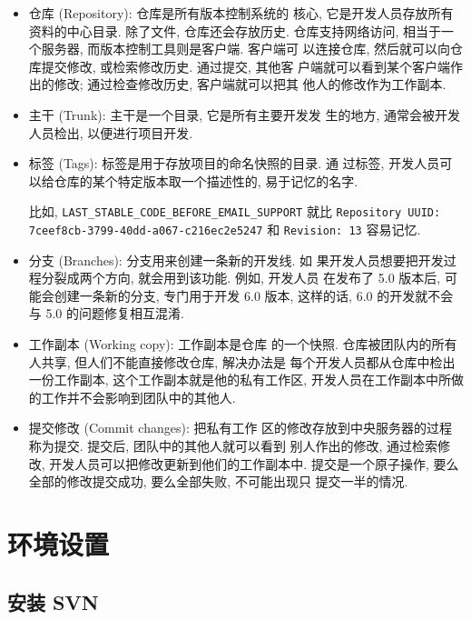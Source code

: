\documentclass[nofonts, oneside]{ctexart}
\begin{document}
\begin{itemize}
  \item 仓库 (Repository): 仓库是所有版本控制系统的
      核心, 它是开发人员存放所有资料的中心目录. 除了文件, 仓库还会存放历史.
      仓库支持网络访问, 相当于一个服务器, 而版本控制工具则是客户端. 客户端可
      以连接仓库, 然后就可以向仓库提交修改, 或检索修改历史. 通过提交, 其他客
      户端就可以看到某个客户端作出的修改; 通过检查修改历史, 客户端就可以把其
      他人的修改作为工作副本.

  \item 主干 (Trunk): 主干是一个目录, 它是所有主要开发发
      生的地方, 通常会被开发人员检出, 以便进行项目开发.

  \item 标签 (Tags): 标签是用于存放项目的命名快照的目录. 通
      过标签, 开发人员可以给仓库的某个特定版本取一个描述性的, 易于记忆的名字.

      比如, \texttt{LAST\_STABLE\_CODE\_BEFORE\_EMAIL\_SUPPORT} 就比
      \texttt{Repository UUID: 7ceef8cb-3799-40dd-a067-c216ec2e5247} 和
      \texttt{Revision: 13} 容易记忆.

  \item 分支 (Branches): 分支用来创建一条新的开发线. 如
      果开发人员想要把开发过程分裂成两个方向, 就会用到该功能. 例如, 开发人员
      在发布了 5.0 版本后, 可能会创建一条新的分支, 专门用于开发 6.0 版本,
      这样的话, 6.0 的开发就不会与 5.0 的问题修复相互混淆.

  \item 工作副本 (Working copy): 工作副本是仓库
      的一个快照. 仓库被团队内的所有人共享, 但人们不能直接修改仓库, 解决办法是
      每个开发人员都从仓库中检出一份工作副本, 这个工作副本就是他的私有工作区,
      开发人员在工作副本中所做的工作并不会影响到团队中的其他人.

  \item 提交修改 (Commit changes): 把私有工作
      区的修改存放到中央服务器的过程称为提交. 提交后, 团队中的其他人就可以看到
      别人作出的修改, 通过检索修改, 开发人员可以把修改更新到他们的工作副本中.
      提交是一个原子操作, 要么全部的修改提交成功, 要么全部失败, 不可能出现只
      提交一半的情况.
\end{itemize}

\section{环境设置}
\label{sec:environment_setup}

\subsection{安装 SVN}
\label{subsec:svn_installation}
\end{document}
